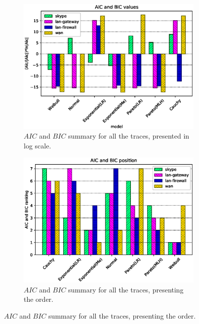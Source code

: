 \clearpage


\begin{figure}[ht!]
\begin{figure}[H]
\centering
\includegraphics[scale=0.5]{figures/apC/rm/aic-bic-logscale-sumary.eps}
\caption{$AIC$ and $BIC$ summary for all the traces, presented in log scale.}
\label{fig:aic-bic-summary-logscale}
\end{figure}
\begin{figure}[H]
\centering
\includegraphics[scale=0.5]{figures/apC/rm/aic-bic-order.eps}
\caption{$AIC$ and $BIC$ summary for all the traces, presenting the order.}
\label{fig:aic-bic-order-old}

\end{figure}
\end{figure}
